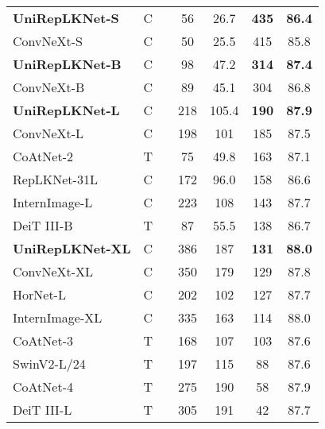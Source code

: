 \documentclass[10pt,twocolumn,letterpaper]{article}
\begin{document}
\begin{table}[t!]
\begin{tabular}{l|c|c|c|c|c|c}
\rowcolor{gray!20}
    \textbf{UniRepLKNet-S}  & C &    &    56 &  26.7    &   \textbf{435}         &   \textbf{86.4}  \\
    ConvNeXt-S~\cite{liu2022convnet}  &   C   &        &   50  &   25.5    & 415   &   85.8\\
\rowcolor{gray!20}
    \textbf{UniRepLKNet-B}  & C &     &   98    &   47.2    &   \textbf{314}     &   \textbf{87.4}\\
    ConvNeXt-B~\cite{liu2022convnet}  & C &    &   89  &   45.1   & 304 &   86.8\\
    \hline
    \rowcolor{gray!20}
    \textbf{UniRepLKNet-L}  & C &     &   218   &   105.4   &   \textbf{190}     &   \textbf{87.9}\\
    ConvNeXt-L~\cite{liu2022convnet} & C & & 198 & 101  &   185 & 87.5\\
    CoAtNet-2~\cite{dai2021coatnet} & T & & 75 & 49.8      &   163  & 87.1      \\
    RepLKNet-31L~\cite{ding2022scaling} & C & & 172   & 96.0    &  158 &   86.6\\
    InternImage-L~\cite{wang2023internimage}    & C & & 223 & 108 & 143    &   87.7 \\
    DeiT III-B~\cite{touvron2022deit} & T &  & 87 & 55.5           & 138    & 86.7    \\
    \hline
    \rowcolor{gray!20}
    \textbf{UniRepLKNet-XL}  & C &    &   386   &   187   &   \textbf{131}     &   \textbf{88.0}\\
    ConvNeXt-XL~\cite{liu2022convnet} & C & & 350 & 179 &   129 & 87.8\\
    
    HorNet-L~\cite{rao2022hornet} & C &  & 202 & 102 & 127  &87.7 \\
    InternImage-XL~\cite{wang2023internimage}   & C & & 335 & 163 & 114    &   88.0 \\


    
    CoAtNet-3~\cite{dai2021coatnet} & T & & 168 & 107    &   103  & 87.6    \\
    SwinV2-L/24~\cite{liu2022swin} & T & & 197 & 115    &   88   & 87.6\\
    CoAtNet-4~\cite{dai2021coatnet} & T & & 275 & 190    &   58   & 87.9    \\
    DeiT III-L~\cite{touvron2022deit} & T &  & 305 & 191         & 42     & 87.7    \\


    
    \hline
        
\end{tabular}     \vspace{-0.2in}
    \label{table-imgnet}
\end{table}
\end{document}
